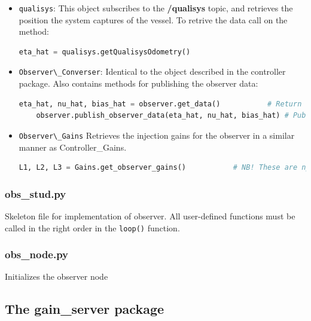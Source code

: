 \begin{itemize}
    \item \lstinline{qualisys}: This object subscribes to the \textbf{/qualisys} topic, and retrieves the position the system captures of the vessel. To retrive the data call on the method: 
    
    \begin{lstlisting}[language=python,basicstyle=\mlttfamily, breaklines=true]
    eta_hat = qualisys.getQualisysOdometry()
    \end{lstlisting}
    
    \item \lstinline{Observer\_Converser}: Identical to the object described in the controller package. Also contains methods for publishing the observer data: 
     \begin{lstlisting}[language=python,basicstyle=\mlttfamily, breaklines=true]
    eta_hat, nu_hat, bias_hat = observer.get_data()           # Return newest estimate
    observer.publish_observer_data(eta_hat, nu_hat, bias_hat) # Publish computed estimate
    \end{lstlisting}
    
    \item \lstinline{Observer\_Gains}
    Retrieves the injection gains for the observer in a similar manner as Controller\_Gains. 
    \begin{lstlisting}[language=python,basicstyle=\mlttfamily, breaklines=true]
    L1, L2, L3 = Gains.get_observer_gains()           # NB! These are np.arrays with n=3 
    \end{lstlisting}
\end{itemize}

\subsubsection{obs\_stud.py}
Skeleton file for implementation of observer. All user-defined functions must be called in the right order in the \lstinline{loop()} function. 

\subsubsection{obs\_node.py}
Initializes the observer node

\subsection{The gain\_server package}

